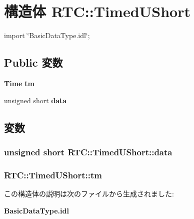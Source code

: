 \section{構造体 RTC::TimedUShort}
\label{structRTC_1_1TimedUShort}


{\ttfamily import \char`\"{}BasicDataType.idl\char`\"{};}

\subsection*{Public 変数}
\begin{DoxyCompactItemize}
\item 
{\bf Time} {\bf tm}
\item 
unsigned short {\bf data}
\end{DoxyCompactItemize}


\subsection{変数}
\subsubsection[{data}]{\setlength{\rightskip}{0pt plus 5cm}unsigned short {\bf RTC::TimedUShort::data}}\label{structRTC_1_1TimedUShort_a9a5950e600ec8593c5b5c15f574ed301}
\subsubsection[{tm}]{ {\bf RTC::TimedUShort::tm}}\label{structRTC_1_1TimedUShort_aba42a7a2a97b9c0b2d3cf642539f0690}


この構造体の説明は次のファイルから生成されました:\begin{DoxyCompactItemize}
\item 
{\bf BasicDataType.idl}\end{DoxyCompactItemize}
